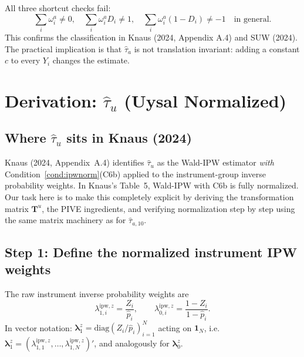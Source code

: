 \documentclass[12pt, a4paper]{article}
\theoremstyle{condstyle}
\theoremstyle{plain}
\newcommand{\bone}{\mathbf{1}_N}
\newcommand{\that}[1]{\hat{\tau}_{#1}}
\newcommand{\phat}{\hat{p}}
\begin{document}
\begin{keyresult}[$\that{a}$ is fully unnormalized]
All three shortcut checks fail:
\[
  \sum_i \omega_i^a \neq 0,\quad
  \sum_i \omega_i^a D_i \neq 1,\quad
  \sum_i \omega_i^a (1-D_i) \neq -1 \quad\text{in general}.
\]
This confirms the classification in Knaus (2024, Appendix A.4) and SUW (2024).
The practical implication is that $\that{a}$ is not translation invariant:
adding a constant $c$ to every $Y_i$ changes the estimate.
\end{keyresult}

\section{Derivation: \texorpdfstring{$\hat\tau_u$}{tau\_u} (Uysal Normalized)}
\label{sec:tau_u}

\subsection{Where \texorpdfstring{$\hat\tau_u$}{tau\_u} sits in Knaus (2024)}

Knaus (2024, Appendix~A.4) identifies $\that{u}$ as the Wald-IPW estimator
\emph{with} Condition~\ref{cond:ipwnorm}(C6b) applied to the instrument-group
inverse probability weights.
In Knaus's Table~5, Wald-IPW with C6b is fully normalized.
Our task here is to make this completely explicit by deriving the transformation
matrix $\mathbf{T}^u$, the PIVE ingredients, and verifying normalization
step by step using the same matrix machinery as for $\that{a,10}$.

\subsection{Step 1: Define the normalized instrument IPW weights}
\label{ssec:u_step1}

The raw instrument inverse probability weights are
\begin{equation}
  \lambda_{1,i}^{\mathrm{ipw},z} = \frac{Z_i}{\phat_i},
  \qquad
  \lambda_{0,i}^{\mathrm{ipw},z} = \frac{1-Z_i}{1-\phat_i}.
  \label{eq:raw_ipw_z}
\end{equation}
In vector notation: $\boldsymbol{\lambda}_1^z = \mathrm{diag}(Z_i/\phat_i)_{i=1}^N$
acting on $\bone$, i.e.\ $\boldsymbol{\lambda}_1^z = (\lambda_{1,1}^{\mathrm{ipw},z},\ldots,\lambda_{1,N}^{\mathrm{ipw},z})'$,
and analogously for $\boldsymbol{\lambda}_0^z$.
\end{document}
